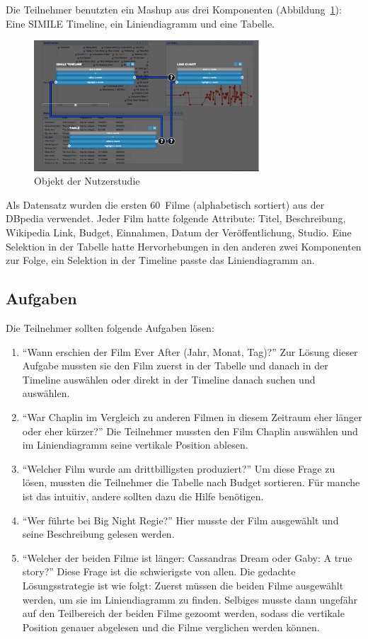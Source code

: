 \documentclass[
	headsepline,
	footsepline,
	fontsize=12pt,
	bibliography=totoc
]{scrbook}
\begin{document}
Die Teilnehmer benutzten ein Mashup aus drei Komponenten (Abbildung~\ref{figure:objekt}): Eine SIMILE Timeline, ein Liniendiagramm und eine Tabelle. 

\begin{figure}[htbp]
   \centering
   \includegraphics[width=0.75\textwidth]{images/evaluation-objekt.png}
   \caption{Objekt der Nutzerstudie}
   \label{figure:objekt}
\end{figure}

Als Datensatz wurden die ersten 60~Filme (alphabetisch sortiert) aus der DBpedia verwendet. Jeder Film hatte folgende Attribute: Titel, Beschreibung, Wikipedia Link, Budget, Einnahmen, Datum der Veröffentlichung, Studio. Eine Selektion in der Tabelle hatte Hervorhebungen in den anderen zwei Komponenten zur Folge, ein Selektion in der Timeline passte das Liniendiagramm an.

\subsection{Aufgaben}

Die Teilnehmer sollten folgende Aufgaben lösen:

\begin{enumerate}
	\item \enquote{Wann erschien der Film Ever After (Jahr, Monat, Tag)?} Zur Lösung dieser Aufgabe mussten sie den Film zuerst in der Tabelle und danach in der Timeline auswählen oder direkt in der Timeline danach suchen und auswählen.
	\item \enquote{War Chaplin im Vergleich zu anderen Filmen in diesem Zeitraum eher länger oder eher kürzer?} Die Teilnehmer mussten den Film Chaplin auswählen und im Liniendiagramm seine vertikale Position ablesen.
	\item \enquote{Welcher Film wurde am drittbilligsten produziert?} Um diese Frage zu lösen, mussten die Teilnehmer die Tabelle nach Budget sortieren. Für manche ist das intuitiv, andere sollten dazu die Hilfe benötigen.
	\item \enquote{Wer führte bei Big Night Regie?} Hier musste der Film ausgewählt und seine Beschreibung gelesen werden.
	\item \enquote{Welcher der beiden Filme ist länger: Cassandras Dream oder Gaby: A true story?} Diese Frage ist die schwierigste von allen. Die gedachte Lösungsstrategie ist wie folgt: Zuerst müssen die beiden Filme ausgewählt werden, um sie im Liniendiagramm zu finden. Selbiges musste dann ungefähr auf den Teilbereich der beiden Filme gezoomt werden, sodass die vertikale Position genauer abgelesen und die Filme verglichen werden können.
\end{enumerate}
\end{document}
